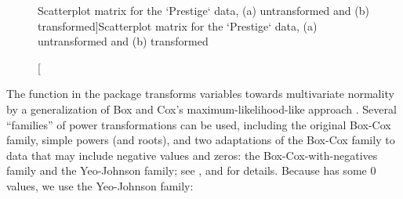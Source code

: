 \documentclass[
]{jss}
\begin{document}
\begin{CodeChunk}
\begin{figure}
{\centering {}

}

\caption[Scatterplot matrix for the `Prestige` data, (a) untransformed and (b) transformed]{Scatterplot matrix for the `Prestige` data, (a) untransformed and (b) transformed}\label{fig:scatterplot-matrix}
\end{figure}
\end{CodeChunk}

The  function in the  package transforms
variables towards multivariate normality by a generalization of Box and
Cox's maximum-likelihood-like approach \citep{BoxCox:1964}. Several
``families'' of power transformations can be used, including the
original Box-Cox family, simple powers (and roots), and two adaptations
of the Box-Cox family to data that may include negative values and
zeros: the Box-Cox-with-negatives family and the Yeo-Johnson family; see
\citet[Chap. 8]{Weisberg:2014}, and \citet[Chap. 3]{FoxWeisberg:2019}
for details. Because  has some 0 values, we use the
Yeo-Johnson family:
\end{document}
